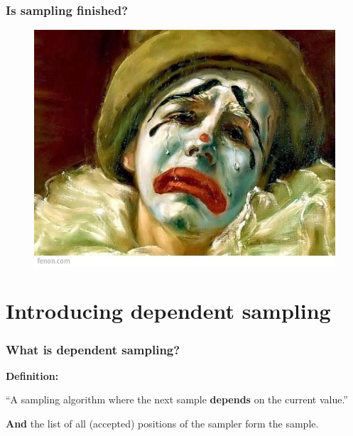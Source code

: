 \documentclass[handout]{beamer}
\begin{document}
\begin{frame}
\frametitle{Is sampling finished?}

\begin{figure}[ht]
\centerline{\includegraphics[width=1\textwidth]{animations_figures/sadClown.jpg}}
\end{figure}

\end{frame}

\section{Introducing dependent sampling}
\frame{\tableofcontents[currentsection]}

\begin{frame}
\frametitle{What is dependent sampling?}
\textbf{Definition:}

\vspace{0.2cm}

\Large
``A sampling algorithm where the next sample \textbf{depends} on the current value.''

\vspace{0.2cm}

 \textbf{And} the list of all (accepted) positions of the sampler form the sample.

\end{frame}
\end{document}
